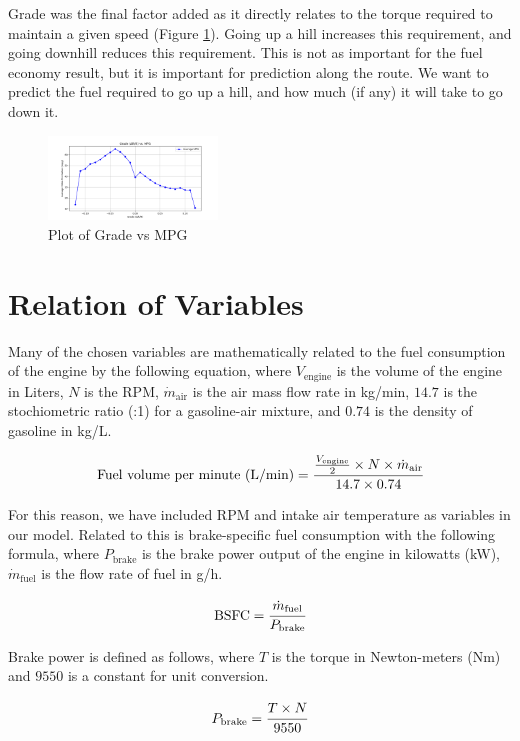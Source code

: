 \documentclass[letterpaper]{article}
\begin{document}
Grade was the final factor added as it directly relates to the torque 
required to maintain a given speed (Figure \ref{fig:gradevsmpg}). Going up 
a hill increases this requirement, and going downhill reduces this 
requirement. This is not as important for the fuel economy result, but it 
is important for prediction along the route. We want to predict the fuel 
required to go up a hill, and how much (if any) it will take to go down it. 

\begin{figure}[htbp]
    \centering
    \includegraphics[width=0.4\textwidth]{figures/grade_vs_mpg.png}
    \caption{Plot of Grade vs MPG}
    \label{fig:gradevsmpg}
\end{figure}

\section*{Relation of Variables}

Many of the chosen variables are mathematically related to the fuel 
consumption of the engine by the following equation, where 
$V_{\mathrm{engine}}$ is the volume of the engine in Liters, $N$ is the 
RPM, $\dot{m}_{\mathrm{air}}$ is the air mass flow rate in kg/min, $14.7$ 
is the stochiometric ratio (:1) for a gasoline-air mixture, and $0.74$ is 
the density of gasoline in kg/L.

\[
\text{Fuel volume per minute (L/min)} = \cfrac{\frac{V_{\mathrm{engine}}}{2} \times N \times \dot{m}_{\mathrm{air}}}{14.7\times 0.74}
\]

For this reason, we have included RPM and intake air temperature as 
variables in our model. Related to this is brake-specific fuel consumption 
with the following formula, where $P_{\mathrm{brake}}$ is the brake power 
output of the engine in kilowatts (kW), $\dot{m}_{\mathrm{fuel}}$ is the 
flow rate of fuel in g/h.

\[
\mathrm{BSFC} = \cfrac{\dot{m}_{\mathrm{fuel}}}{P_{\mathrm{brake}}}
\]

Brake power is defined as follows, where $T$ is the torque in Newton-meters 
(Nm) and $9550$ is a constant for unit conversion.

\[
P_{\mathrm{brake}} = \cfrac{T \times N}{9550}
\]
\end{document}
